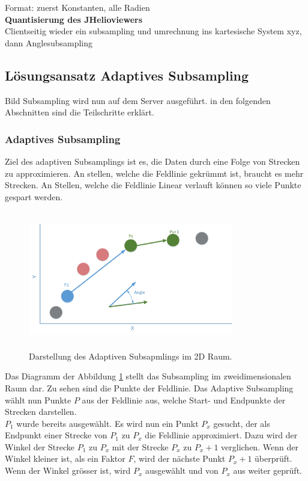 Format: zuerst Konstanten, alle Radien\\

\textbf{Quantisierung des JHelioviewers}\\
Clientseitig wieder ein subsampling und umrechnung ins kartesische System xyz, dann Anglesubsampling
	
\subsection{Lösungsansatz Adaptives Subsampling}
Bild
Subsampling wird nun auf dem Server ausgeführt. in den folgenden Abschnitten sind die Teilschritte erklärt.

\subsubsection{Adaptives Subsampling}\label{konzept:loesung0:subsampling}
Ziel des adaptiven Subsamplings ist es, die Daten durch eine Folge von Strecken zu approximieren. An stellen, welche die Feldlinie gekrümmt ist, braucht es mehr Strecken. An Stellen, welche die Feldlinie Linear verlauft können so viele Punkte gespart werden. 
\begin{figure}[!htbp]
	\center
	\includegraphics[width=0.8\textwidth,height=6cm,keepaspectratio]{./pictures/konzept/solution0/anglesubsampling.png}
	\caption{Darstellung des Adaptiven Subsapmlings im 2D Raum.}
	\label{konzept:loesung0:angle}
\end{figure}
Das Diagramm der Abbildung \ref{konzept:loesung0:angle} stellt das Subsampling im zweidimensionalen Raum dar. Zu sehen sind die Punkte der Feldlinie. Das Adaptive Subsampling wählt nun Punkte $P$ aus der Feldlinie aus, welche Start- und Endpunkte der Strecken darstellen.\\
$P_1$ wurde bereits ausgewählt. Es wird nun ein Punkt $P_x$ gesucht, der als Endpunkt einer Strecke von $P_1$ zu $P_x$ die Feldlinie approximiert. Dazu wird der Winkel der Strecke $P_1$ zu $P_x$ mit der Strecke $P_x$ zu $P_x+1$ verglichen. Wenn der Winkel kleiner ist, als ein Faktor $F$, wird der nächste Punkt $P_x+1$ überprüft. Wenn der Winkel grösser ist, wird $P_x$ ausgewählt und von $P_x$ aus weiter geprüft.

